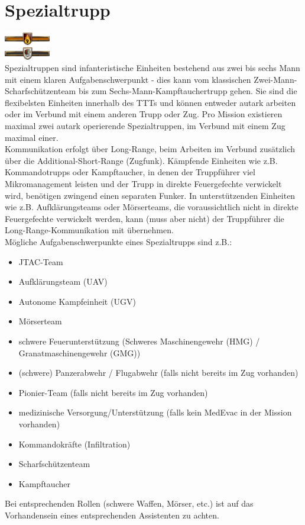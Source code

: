 \section{Spezialtrupp}
\includegraphics[width=20mm]{./img/truppenordnung/spezialeinheiten/sf1.png}\\
\includegraphics[width=20mm]{./img/truppenordnung/spezialeinheiten/sf2.png}\\
Spezialtruppen sind infanteristische Einheiten bestehend aus zwei bis sechs Mann mit einem klaren Aufgabenschwerpunkt - dies kann vom klassischen Zwei-Mann-Scharfschützenteam bis zum Sechs-Mann-Kampftauchertrupp gehen. Sie sind die flexibelsten Einheiten innerhalb des TTTs und können entweder autark arbeiten oder im Verbund mit einem anderen Trupp oder Zug. Pro Mission existieren maximal zwei autark operierende Spezialtruppen, im Verbund mit einem Zug maximal einer.\\
Kommunikation erfolgt über Long-Range, beim Arbeiten im Verbund zusätzlich über die Additional-Short-Range (Zugfunk). Kämpfende Einheiten wie z.B. Kommandotrupps oder Kampftaucher, in denen der Truppführer viel Mikromanagement leisten und der Trupp in direkte Feuergefechte verwickelt wird, benötigen zwingend einen separaten Funker. In unterstützenden Einheiten wie z.B. Aufklärungsteams oder Mörserteams, die voraussichtlich nicht in direkte Feuergefechte verwickelt werden, kann (muss aber nicht) der Truppführer die Long-Range-Kommunikation mit übernehmen.\\
Mögliche Aufgabenschwerpunkte eines Spezialtrupps sind z.B.:
\begin{itemize}
	\item JTAC-Team
	\item Aufklärungsteam (UAV)
	\item Autonome Kampfeinheit (UGV)
	\item Mörserteam
	\item schwere Feuerunterstützung (Schweres Maschinengewehr (HMG) / Granatmaschinengewehr (GMG))
	\item (schwere) Panzerabwehr / Flugabwehr (falls nicht bereits im Zug vorhanden)
	\item Pionier-Team (falls nicht bereits im Zug vorhanden)
	\item medizinische Versorgung/Unterstützung (falls kein MedEvac in der Mission vorhanden)
	\item Kommandokräfte (Infiltration)
	\item Scharfschützenteam
	\item Kampftaucher
\end{itemize}
Bei entsprechenden Rollen (schwere Waffen, Mörser, etc.) ist auf das Vorhandensein eines entsprechenden Assistenten zu achten.